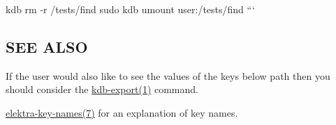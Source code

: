 kdb rm -\/r /tests/find sudo kdb umount user\+:/tests/find ```\hypertarget{doc_help_kdb-find_md_autotoc_md2679}{}\subsection{S\+E\+E A\+L\+SO}\label{doc_help_kdb-find_md_autotoc_md2679}

\begin{DoxyItemize}
\item If the user would also like to see the values of the keys below {\ttfamily path} then you should consider the \hyperlink{doc_help_kdb-export_md}{kdb-\/export(1)} command.
\item \hyperlink{doc_help_elektra-key-names_md}{elektra-\/key-\/names(7)} for an explanation of key names. 
\end{DoxyItemize}